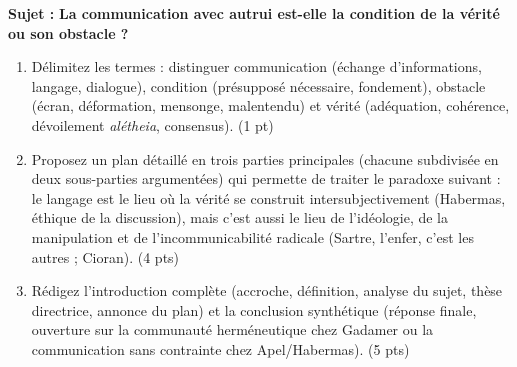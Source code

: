 \documentclass[11pt]{article}
\begin{document}
\begin{exercice}
\textbf{Sujet :} \og \textbf{La communication avec autrui est-elle la condition de la vérité ou son obstacle ?} \fg{}

\begin{enumerate}
    \item Délimitez les termes : distinguer \og communication \fg{} (échange d'informations, langage, dialogue), \og condition \fg{} (présupposé nécessaire, fondement), \og obstacle \fg{} (écran, déformation, mensonge, malentendu) et \og vérité \fg{} (adéquation, cohérence, dévoilement \textit{alétheia}, consensus). (1 pt)
    \item Proposez un plan détaillé en trois parties principales (chacune subdivisée en deux sous-parties argumentées) qui permette de traiter le paradoxe suivant : le langage est le lieu où la vérité se construit intersubjectivement (Habermas, éthique de la discussion), mais c'est aussi le lieu de l'idéologie, de la manipulation et de l'incommunicabilité radicale (Sartre, \og l'enfer, c'est les autres \fg{} ; Cioran). (4 pts)
    \item Rédigez l'introduction complète (accroche, définition, analyse du sujet, thèse directrice, annonce du plan) et la conclusion synthétique (réponse finale, ouverture sur la \og communauté herméneutique \fg{} chez Gadamer ou la \og communication sans contrainte \fg{} chez Apel/Habermas). (5 pts)
\end{enumerate}
\end{exercice}
\end{document}
